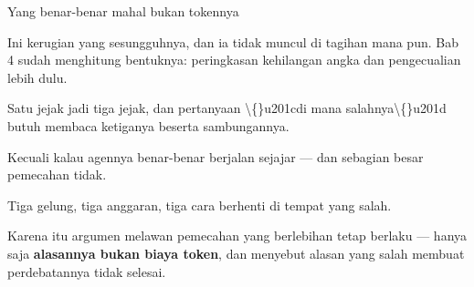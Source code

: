 \documentclass[aspectratio=169,11pt,t]{beamer}
\begin{document}
\begin{frame}[shrink=25]{Yang benar-benar mahal bukan tokennya}
\begin{minipage}[t]{0.494\textwidth}
\begin{icardbad}
Ini kerugian yang sesungguhnya, dan ia tidak muncul di tagihan mana pun. Bab 4 sudah menghitung bentuknya: peringkasan kehilangan angka dan pengecualian lebih dulu.
\end{icardbad}
\end{minipage}%
\hfill
\begin{minipage}[t]{0.494\textwidth}
\begin{icardbad}
Satu jejak jadi tiga jejak, dan pertanyaan \textbackslash\{\}u201cdi mana salahnya\textbackslash\{\}u201d butuh membaca ketiganya beserta sambungannya.
\end{icardbad}
\end{minipage}%


\vskip 4pt

\begin{minipage}[t]{0.494\textwidth}
\begin{icard}
Kecuali kalau agennya benar-benar berjalan sejajar --- dan sebagian besar pemecahan tidak.
\end{icard}
\end{minipage}%
\hfill
\begin{minipage}[t]{0.494\textwidth}
\begin{icard}
Tiga gelung, tiga anggaran, tiga cara berhenti di tempat yang salah.
\end{icard}
\end{minipage}%
{\fontsize{9.4}{12.6}\selectfont\color{fg2}Karena itu argumen melawan pemecahan yang berlebihan tetap berlaku --- hanya saja \textbf{alasannya bukan biaya token}, dan menyebut alasan yang salah membuat perdebatannya tidak selesai.\par}\vskip 4pt
\end{frame}

\end{document}

